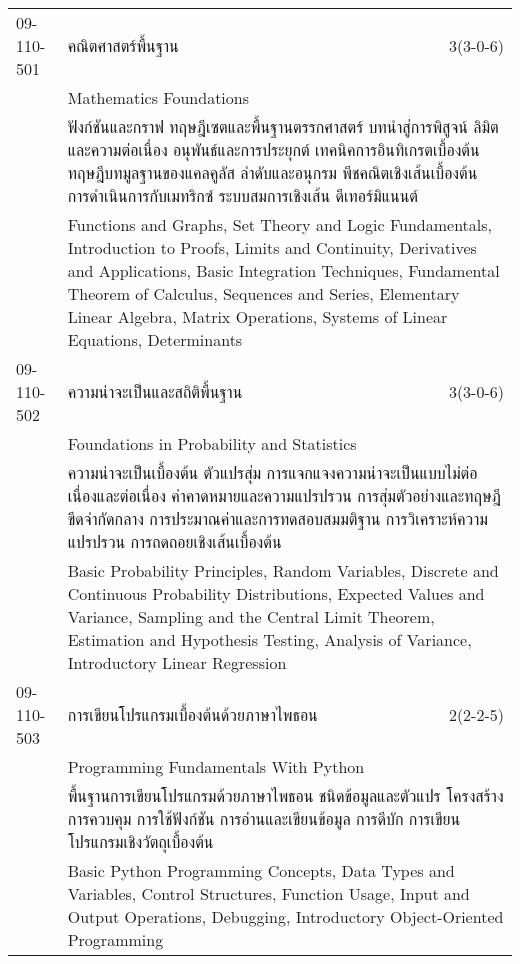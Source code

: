 \begin{longtable}{p{}p{}r{}}
09-110-501 & คณิตศาสตร์พื้นฐาน & 3(3-0-6)\\*
 & Mathematics Foundations & \phantom{x} \vspace{3mm} \\*
&  \multicolumn{2}{p{0.75\textwidth}}{ฟังก์ชันและกราฟ ทฤษฎีเซตและพื้นฐานตรรกศาสตร์ บทนำสู่การพิสูจน์ ลิมิตและความต่อเนื่อง อนุพันธ์และการประยุกต์ เทคนิคการอินทิเกรตเบื้องต้น ทฤษฎีบทมูลฐานของแคลคูลัส ลำดับและอนุกรม พีชคณิตเชิงเส้นเบื้องต้น การดำเนินการกับเมทริกซ์ ระบบสมการเชิงเส้น ดีเทอร์มิแนนต์} \vspace{3mm} \\*
&  \multicolumn{2}{p{0.75\textwidth}}{Functions and Graphs, Set Theory and Logic Fundamentals, Introduction to Proofs, Limits and Continuity, Derivatives and Applications, Basic Integration Techniques, Fundamental Theorem of Calculus, Sequences and Series, Elementary Linear Algebra, Matrix Operations, Systems of Linear Equations, Determinants} \vspace{8mm} \\*
09-110-502 & ความน่าจะเป็นและสถิติพื้นฐาน & 3(3-0-6)\\*
 & Foundations in Probability and Statistics & \phantom{x} \vspace{3mm} \\*
&  \multicolumn{2}{p{0.75\textwidth}}{ความน่าจะเป็นเบื้องต้น ตัวแปรสุ่ม การแจกแจงความน่าจะเป็นแบบไม่ต่อเนื่องและต่อเนื่อง ค่าคาดหมายและความแปรปรวน การสุ่มตัวอย่างและทฤษฎีขีดจำกัดกลาง การประมาณค่าและการทดสอบสมมติฐาน การวิเคราะห์ความแปรปรวน การถดถอยเชิงเส้นเบื้องต้น} \vspace{3mm} \\*
&  \multicolumn{2}{p{0.75\textwidth}}{Basic Probability Principles, Random Variables, Discrete and Continuous Probability Distributions, Expected Values and Variance, Sampling and the Central Limit Theorem, Estimation and Hypothesis Testing, Analysis of Variance, Introductory Linear Regression} \vspace{8mm} \\*
09-110-503 & การเขียนโปรแกรมเบื้องต้นด้วยภาษาไพธอน & 2(2-2-5)\\*
 & Programming Fundamentals With Python & \phantom{x} \vspace{3mm} \\*
&  \multicolumn{2}{p{0.75\textwidth}}{พื้นฐานการเขียนโปรแกรมด้วยภาษาไพธอน ชนิดข้อมูลและตัวแปร โครงสร้างการควบคุม การใช้ฟังก์ชัน การอ่านและเขียนข้อมูล การดีบัก การเขียนโปรแกรมเชิงวัตถุเบื้องต้น} \vspace{3mm} \\*
&  \multicolumn{2}{p{0.75\textwidth}}{Basic Python Programming Concepts, Data Types and Variables, Control Structures, Function Usage, Input and Output Operations, Debugging, Introductory Object-Oriented Programming} \vspace{8mm} \\*
\end{longtable}
